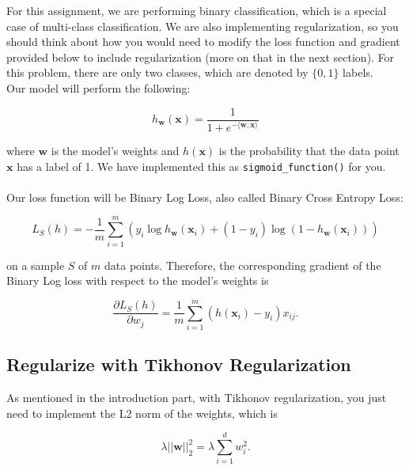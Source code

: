 \documentclass{article}
\begin{document}
For this assignment, we are performing binary classification, which is a special case of multi-class classification. We are also implementing regularization, so you should think about how you would need to modify the loss function and gradient provided below to include regularization (more on that in the next section). For this problem, there are only two classes, which are denoted by $\{0, 1\}$ labels. \\

\noindent Our model will perform the following: 

\begin{equation}
    h_\mathbf{w}(\mathbf{x}) = \frac{1}{1 + e^{-\langle\mathbf{w}, \mathbf{x}\rangle}}
    \label{eq:sigmoid}
\end{equation}

\noindent where $\mathbf{w}$ is the model's weights and $h(\mathbf{x})$ is the probability that the data point $\mathbf{x}$ has a label of 1. We have implemented this as \texttt{sigmoid\_function()} for you. \\ \\
Our loss function will be Binary Log Loss, also called Binary Cross Entropy Loss:

\begin{equation}
    L_S(h) = -\frac{1}{m} \sum_{i=1}^m (y_i \log h_\mathbf{w}(\mathbf{x}_i) + (1 - y_i)\log (1 - h_\mathbf{w}(\mathbf{x}_i))) 
    \label{eq:binaryce}
\end{equation}

\noindent on a sample $S$ of $m$ data points. Therefore, the corresponding gradient of the Binary Log loss with respect to the model's weights is 

\begin{equation}
    \frac{\partial L_S(h)}{\partial w_j} = \frac{1}{m} \sum_{i=1}^m (h(\mathbf{x}_i) - y_i)x_{ij}.
    \label{eq:binarycegrad}
\end{equation}

\subsection*{Regularize with Tikhonov Regularization}
As mentioned in the introduction part, with Tikhonov regularization, you just need to implement the L2 norm of the weights, which is 

\begin{equation}
    \lambda||\mathbf{w}||_2^2 = \lambda\sum_{i=1}^{d}w_i^2.
    \label{eq:l2norm}
\end{equation}
\end{document}
